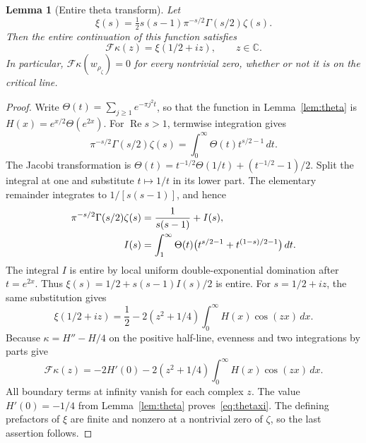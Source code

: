 \documentclass[11pt,a4paper]{article}
\numberwithin{equation}{section}
\newtheorem{lemma}[theorem]{Lemma}
\theoremstyle{remark}
\newcommand{\C}{\mathbb C}
\begin{document}
\begin{lemma}[Entire theta transform]\label{lem:thetaxi}
Let
\[
 \xi(s)=\tfrac12s(s-1)\pi^{-s/2}\Gamma(s/2)\zeta(s).
\]
Then the entire continuation of this function satisfies
\begin{equation}\label{eq:thetaxi}
 \mathcal F\kappa(z)=\xi(1/2+iz),\qquad z\in\C.
\end{equation}
In particular, $\mathcal F\kappa(w_{\rho_\zeta})=0$ for every nontrivial zero, whether or not it is on the critical line.
\end{lemma}
\begin{proof}
Write $\Theta(t)=\sum_{j\ge1}e^{-\pi j^2t}$, so that the function in Lemma~\ref{lem:theta} is $H(x)=e^{x/2}\Theta(e^{2x})$. For $\operatorname{Re}s>1$, termwise integration gives
\[
 \pi^{-s/2}\Gamma(s/2)\zeta(s)
   =\int_0^\infty\Theta(t)t^{s/2-1}\,dt.
\]
The Jacobi transformation is
$\Theta(t)=t^{-1/2}\Theta(1/t)+(t^{-1/2}-1)/2$.
Split the integral at one and substitute $t\mapsto1/t$ in its lower part. The elementary remainder integrates to $1/[s(s-1)]$, and hence
\begin{align}\label{eq:mellintheta}
 \pi^{-s/2}\Gamma(s/2)\zeta(s)
 &=\frac1{s(s-1)}+I(s),\notag\\
 I(s)&=\int_1^\infty\Theta(t)
       \bigl(t^{s/2-1}+t^{(1-s)/2-1}\bigr)\,dt.
\end{align}
The integral $I$ is entire by local uniform double-exponential domination after $t=e^{2x}$. Thus
$\xi(s)=1/2+s(s-1)I(s)/2$ is entire. For $s=1/2+iz$, the same substitution gives
\begin{equation}\label{eq:xiH}
 \xi(1/2+iz)=\frac12
       -2(z^2+1/4)\int_0^\infty H(x)\cos(zx)\,dx.
\end{equation}
Because $\kappa=H''-H/4$ on the positive half-line, evenness and two integrations by parts give
\[
 \mathcal F\kappa(z)
  =-2H'(0)-2(z^2+1/4)\int_0^\infty H(x)\cos(zx)\,dx.
\]
All boundary terms at infinity vanish for each complex $z$. The value $H'(0)=-1/4$ from Lemma~\ref{lem:theta} proves~\eqref{eq:thetaxi}. The defining prefactors of $\xi$ are finite and nonzero at a nontrivial zero of $\zeta$, so the last assertion follows.
\end{proof}
\end{document}
